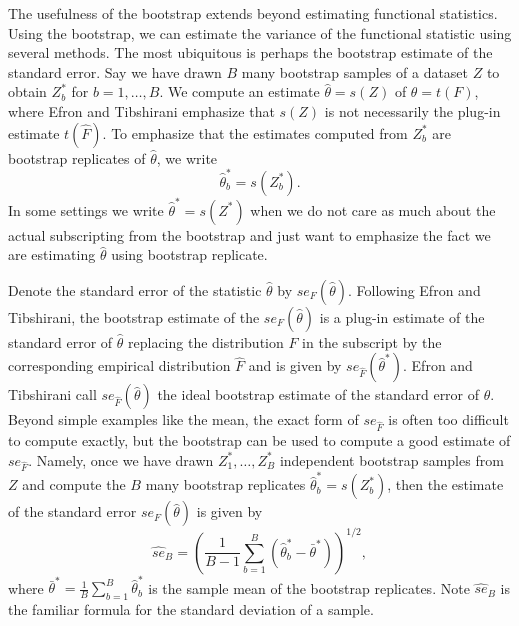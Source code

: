 \documentclass[12pt,twoside]{reedthesis}
\theoremstyle{definition}
\theoremstyle{definition}
\theoremstyle{definition}
\theoremstyle{remark}
\begin{document}
The usefulness of the bootstrap extends beyond estimating functional
statistics. Using the bootstrap, we can estimate the variance of the
functional statistic using several methods. The most ubiquitous is
perhaps the bootstrap estimate of the standard error. Say we have drawn
\(B\) many bootstrap samples of a dataset \(Z\) to obtain \(Z_b^*\) for
\(b=1,\ldots,B\). We compute an estimate \(\hat{\theta}=s(Z)\) of
\(\theta=t(F)\), where Efron and Tibshirani emphasize that \(s(Z)\) is
not necessarily the plug-in estimate \(t(\hat{F})\). To emphasize that
the estimates computed from \(Z_b^*\) are bootstrap replicates of
\(\hat{\theta}\), we write \[\hat{\theta}_b^*=s(Z_b^*).\] In some
settings we write \(\hat{\theta}^*=s(Z^*)\) when we do not care as much
about the actual subscripting from the bootstrap and just want to
emphasize the fact we are estimating \(\hat{\theta}\) using bootstrap
replicate.

Denote the standard error of the statistic \(\hat{\theta}\) by
\(se_F(\hat{\theta})\). Following Efron and Tibshirani, the bootstrap
estimate of the \(se_F(\hat{\theta})\) is a plug-in estimate of the
standard error of \(\hat{\theta}\) replacing the distribution \(F\) in
the subscript by the corresponding empirical distribution \(\hat{F}\)
and is given by \(se_{\hat{F}}(\hat{\theta}^*)\). Efron and Tibshirani
call \(se_{\hat{F}}(\hat{\theta})\) the ideal bootstrap estimate of the
standard error of \(\hat{\theta}\). Beyond simple examples like the
mean, the exact form of \(se_{\hat{F}}\) is often too difficult to
compute exactly, but the bootstrap can be used to compute a good
estimate of \(se_{\hat{F}}\). Namely, once we have drawn
\(Z_1^*, \ldots, Z_B^*\) independent bootstrap samples from \(Z\) and
compute the \(B\) many bootstrap replicates
\(\hat{\theta}_b^*=s(Z_b^*)\), then the estimate of the standard error
\(se_{F}(\hat{\theta})\) is given by
\[\widehat{se}_B=\left(\frac{1}{B-1}\sum_{b=1}^B (\hat{\theta}_b^*-\bar{\theta}^*)\right)^{1/2},\]
where \(\bar{\theta}^*=\frac{1}{B}\sum_{b=1}^B\hat{\theta}_b^*\) is the
sample mean of the bootstrap replicates. Note \(\widehat{se}_B\) is the
familiar formula for the standard deviation of a sample.
\end{document}
